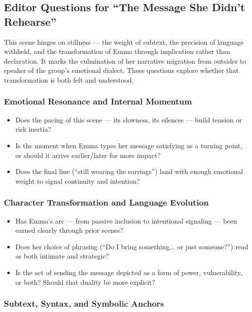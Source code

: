 \subsection*{Editor Questions for ``The Message She Didn’t Rehearse''}

This scene hinges on stillness — the weight of subtext, the precision of language withheld, and the transformation of Emma through implication rather than declaration. It marks the culmination of her narrative migration from outsider to speaker of the group's emotional dialect. These questions explore whether that transformation is both felt and understood.

\subsubsection*{Emotional Resonance and Internal Momentum}

\begin{itemize}
  \item Does the pacing of this scene — its slowness, its silences — build tension or risk inertia?
  \item Is the moment when Emma types her message satisfying as a turning point, or should it arrive earlier/later for more impact?
  \item Does the final line (“still wearing the earrings”) land with enough emotional weight to signal continuity and intention?
\end{itemize}

\subsubsection*{Character Transformation and Language Evolution}

\begin{itemize}
  \item Has Emma’s arc — from passive inclusion to intentional signaling — been earned clearly through prior scenes?
  \item Does her choice of phrasing (“Do I bring something... or just someone?”) read as both intimate and strategic?
  \item Is the act of sending the message depicted as a form of power, vulnerability, or both? Should that duality be more explicit?
\end{itemize}

\subsubsection*{Subtext, Syntax, and Symbolic Anchors}

